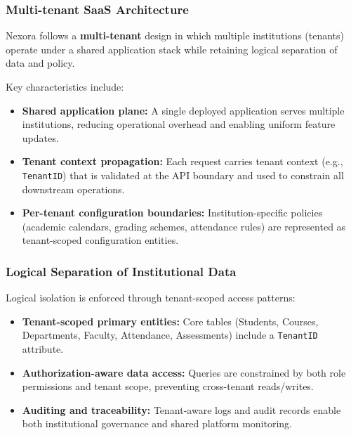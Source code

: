\documentclass[11pt]{article}
\providecommand{\tightlist}{%
  \setlength{\itemsep}{0pt}\setlength{\parskip}{0pt}}
\begin{document}
\subsubsection{Multi-tenant SaaS
Architecture}\label{multi-tenant-saas-architecture}

Nexora follows a \textbf{multi-tenant} design in which multiple
institutions (tenants) operate under a shared application stack while
retaining logical separation of data and policy.

Key characteristics include:

\begin{itemize}
\tightlist
\item
  \textbf{Shared application plane:} A single deployed application
  serves multiple institutions, reducing operational overhead and
  enabling uniform feature updates.
\item
  \textbf{Tenant context propagation:} Each request carries tenant
  context (e.g., \texttt{TenantID}) that is validated at the API
  boundary and used to constrain all downstream operations.
\item
  \textbf{Per-tenant configuration boundaries:} Institution-specific
  policies (academic calendars, grading schemes, attendance rules) are
  represented as tenant-scoped configuration entities.
\end{itemize}

\subsubsection{Logical Separation of Institutional
Data}\label{logical-separation-of-institutional-data}

Logical isolation is enforced through tenant-scoped access patterns:

\begin{itemize}
\tightlist
\item
  \textbf{Tenant-scoped primary entities:} Core tables (Students,
  Courses, Departments, Faculty, Attendance, Assessments) include a
  \texttt{TenantID} attribute.
\item
  \textbf{Authorization-aware data access:} Queries are constrained by
  both role permissions and tenant scope, preventing cross-tenant
  reads/writes.
\item
  \textbf{Auditing and traceability:} Tenant-aware logs and audit
  records enable both institutional governance and shared platform
  monitoring.
\end{itemize}
\end{document}
